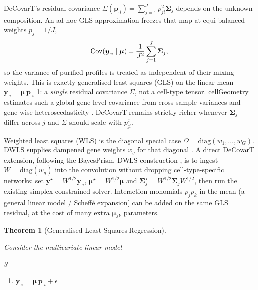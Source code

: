 \documentclass[pdflatex, sn-nature]{sn-jnl}
\theoremstyle{thmstyleone}%
\newtheorem{theorem}{Theorem}%
\theoremstyle{thmstyletwo}%
\theoremstyle{thmstylethree}%
\begin{document}
\begin{appendices}
        DeCovarT's residual covariance
        $\Sigma(\boldsymbol{p}_{\cdot i})=\sum_{j=1}^{J}p_{ji}^{2}\boldsymbol{\Sigma}_{j}$
        depends on the unknown composition. An ad-hoc GLS approximation freezes
        that map at equi-balanced weights $p_{j}=1/J$,
        \begin{equation}
            \label{eq-18}
            \operatorname*{Cov}(\boldsymbol{y}_{\cdot i}\mid\boldsymbol{\mu})
            =\frac{1}{J^{2}}\sum_{j=1}^{J}\boldsymbol{\Sigma}_{j},
        \end{equation}
        so the variance of purified profiles is treated as independent of their
        mixing weights. This is exactly generalised least squares (GLS) on the
        linear mean $\boldsymbol{y}_{\cdot i}=\boldsymbol{\mu}\,\boldsymbol{p}_{\cdot i}$
        \ref{th:generalized-least-squares-estimate}: a \emph{single} residual
        covariance $\Sigma$, not a cell-type tensor. cellGeometry estimates such
        a global gene-level covariance from cross-sample variances and
        gene-wise heteroscedasticity
        \cite{lauCellGeometryUltrafastSinglecell2026}. DeCovarT remains
        strictly richer whenever $\boldsymbol{\Sigma}_{j}$ differ across $j$ and
        $\Sigma$ should scale with $p_{ji}^{2}$.

        Weighted least squares (WLS) is the diagonal special case
        $\Omega=\mathrm{diag}(w_{1},\ldots,w_{G})$. DWLS supplies dampened gene
        weights $w_{g}$ for that diagonal
        \cite{tsoucasAccurateEstimationCelltype2019}. A direct DeCovarT
        extension, following the BayesPrism--DWLS construction
        \cite{zhangIntegratedInferenceCellularCompositions2026}, is to ingest
        $W=\mathrm{diag}(w_{g})$ into the convolution without dropping
        cell-type-specific networks: set
        $\boldsymbol{y}^{\star}=W^{1/2}\boldsymbol{y}_{\cdot i}$,
        $\boldsymbol{\mu}^{\star}=W^{1/2}\boldsymbol{\mu}$ and
        $\boldsymbol{\Sigma}_{j}^{\star}=W^{1/2}\boldsymbol{\Sigma}_{j}W^{1/2}$, then run
        the existing simplex-constrained solver. Interaction monomials
        $p_{j}p_{k}$ in the mean (a general linear model / Scheff\'{e}
        expansion) can be added on the same GLS residual, at the cost of many
        extra $\boldsymbol{\mu}_{jk}$ parameters.

        \begin{theorem}[Generalised Least Squares Regression]
            \label{th:generalized-least-squares-estimate}

            Consider the multivariate linear model
            \begin{multicols}{3}
                \begin{enumerate}
                    \item $\boldsymbol{y}_{\cdot i}=\boldsymbol{\mu}\,\boldsymbol{p}_{\cdot i}
                          +\epsilon$


\end{enumerate}
\end{multicols}
\end{theorem}
\end{appendices}
\end{document}
